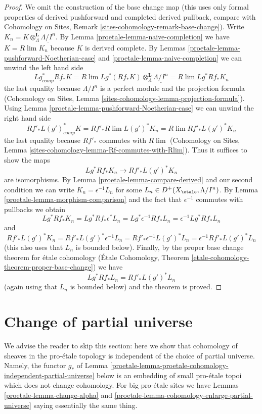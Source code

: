 \begin{proof}

We omit the construction of the base change map (this uses only
formal properties of derived pushforward and completed derived pullback,
compare with
Cohomology on Sites, Remark \ref{sites-cohomology-remark-base-change}).
Write $K_n = K \otimes^\mathbf{L}_\Lambda \underline{\Lambda/I^n}$.
By Lemma \ref{proetale-lemma-naive-completion} we have $K = R\lim K_n$
because $K$ is derived complete.
By Lemmas \ref{proetale-lemma-pushforward-Noetherian-case} and
\ref{proetale-lemma-naive-completion} we can unwind the left hand side
$$
Lg_{comp}^* Rf_* K =
R\lim Lg^*(Rf_*K)\otimes^\mathbf{L}_\Lambda \underline{\Lambda/I^n} =
R\lim Lg^* Rf_* K_n
$$
the last equality because $\Lambda/I^n$ is a perfect module and
the projection formula (Cohomology on Sites, Lemma
\ref{sites-cohomology-lemma-projection-formula}).
Using Lemma \ref{proetale-lemma-pushforward-Noetherian-case} we can unwind the right
hand side
$$
Rf'_* L(g')^*_{comp} K =
Rf'_* R\lim L(g')^* K_n  =
R\lim Rf'_* L(g')^* K_n
$$
the last equality because $Rf'_*$ commutes with $R\lim$
(Cohomology on Sites, Lemma
\ref{sites-cohomology-lemma-Rf-commutes-with-Rlim}).
Thus it suffices to show the maps
$$
Lg^* Rf_* K_n \longrightarrow Rf'_* L(g')^* K_n
$$
are isomorphisms. By Lemma \ref{proetale-lemma-compare-derived} and our second
condition we can write $K_n = \epsilon^{-1}L_n$ for some
$L_n \in D^+(X_\etale, \Lambda/I^n)$. By Lemma \ref{proetale-lemma-morphism-comparison}
and the fact that $\epsilon^{-1}$ commutes with pullbacks
we obtain
$$
Lg^* Rf_* K_n =
Lg^* Rf_* \epsilon^*L_n =
Lg^* \epsilon^{-1} Rf_* L_n =
\epsilon^{-1} Lg^* Rf_* L_n
$$
and
$$
Rf'_* L(g')^* K_n =
Rf'_* L(g')^* \epsilon^{-1} L_n =
Rf'_* \epsilon^{-1} L(g')^* L_n =
\epsilon^{-1} Rf'_* L(g')^* L_n
$$
(this also uses that $L_n$ is bounded below).
Finally, by the proper base change theorem for \'etale cohomology
(\'Etale Cohomology, Theorem
\ref{etale-cohomology-theorem-proper-base-change}) we have
$$
Lg^* Rf_* L_n = Rf'_* L(g')^* L_n
$$
(again using that $L_n$ is bounded below)
and the theorem is proved.
\end{proof}

\section{Change of partial universe}
\label{proetale-section-change-universe}
We advise the reader to skip this section: here we show that cohomology
of sheaves in the pro-\'etale topology is independent of the
choice of partial universe. Namely, the functor $g_*$ of
Lemma \ref{proetale-lemma-proetale-cohomology-independent-partial-universe} below
is an embedding of small pro-\'etale topoi which does not change cohomology.
For big pro-\'etale sites we have Lemmas \ref{proetale-lemma-change-alpha} and
\ref{proetale-lemma-cohomology-enlarge-partial-universe} saying essentially the
same thing.

